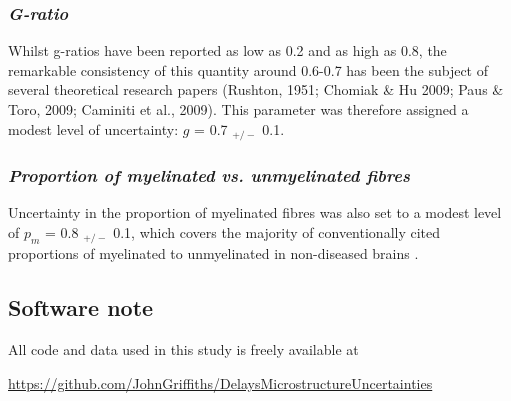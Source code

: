 
\subsubsection*{\textit{G-ratio}}

Whilst g-ratios have been reported as low as 0.2 and as high as 0.8, the
remarkable consistency of this quantity around 0.6-0.7 has been the
subject of several theoretical research papers (Rushton, 1951; Chomiak
\& Hu 2009; Paus \& Toro, 2009; Caminiti et al., 2009). This parameter
was therefore assigned a modest level of uncertainty: $g$ = 0.7 $_{+/-}$
0.1. 

\subsubsection*{\textit{Proportion of myelinated vs. unmyelinated fibres}}

Uncertainty in the proportion of myelinated fibres was
also set to a modest level of $p_{m}$ = 0.8 $_{+/-}$ 0.1, which covers
the majority of conventionally cited proportions of myelinated to
unmyelinated in non-diseased brains  \cite{bowley2010age}.

 
\subsection{Software note}

All code and data used in this study is freely available at 

\href{http://}{https://github.com/JohnGriffiths/DelaysMicrostructureUncertainties} 



